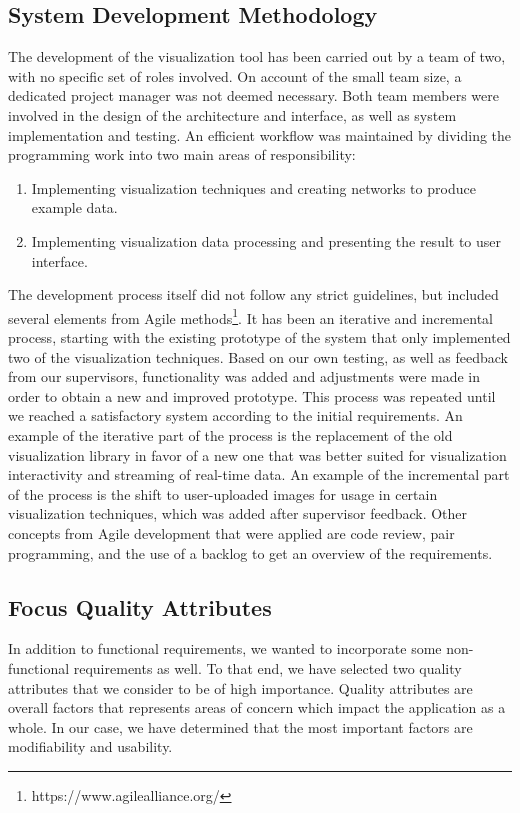 \subsection{System Development Methodology}

The development of the visualization tool has been carried out by a team of two, with no specific set of roles involved. On account of the small team size, a dedicated project manager was not deemed necessary. Both team members were involved in the design of the architecture and interface, as well as system implementation and testing. An efficient workflow was maintained by dividing the programming work into two main areas of responsibility:
\begin{enumerate}
    \item Implementing visualization techniques and creating networks to produce example data.
    \item Implementing visualization data processing and presenting the result to user interface.
\end{enumerate}

\noindent The development process itself did not follow any strict guidelines, but included several elements from Agile methods\footnote{https://www.agilealliance.org/}. It has been an iterative and incremental process, starting with the existing prototype of the system that only implemented two of the visualization techniques. Based on our own testing, as well as feedback from our supervisors, functionality was added and adjustments were made in order to obtain a new and improved prototype. This process was repeated until we reached a satisfactory system according to the initial requirements. An example of the iterative part of the process is the replacement of the old visualization library in favor of a new one that was better suited for visualization interactivity and streaming of real-time data. An example of the incremental part of the process is the shift to user-uploaded images for usage in certain visualization techniques, which was added after supervisor feedback. Other concepts from Agile development that were applied are code review, pair programming, and the use of a backlog to get an overview of the requirements.

\subsection{Focus Quality Attributes}

In addition to functional requirements, we wanted to incorporate some non-functional requirements as well. To that end, we have selected two quality attributes that we consider to be of high importance. Quality attributes are overall factors that represents areas of concern which impact the application as a whole. In our case, we have determined that the most important factors are modifiability and usability.


